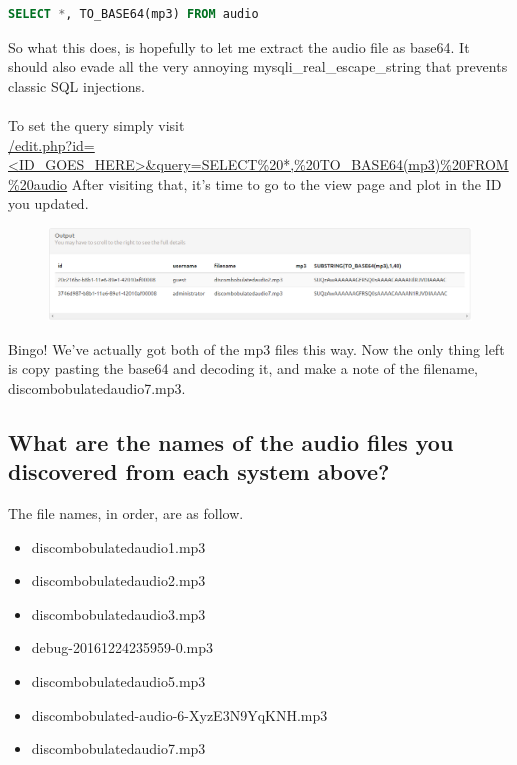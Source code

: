 \documentclass[writeup.tex]{subfiles}
\begin{document}
			\begin{lstlisting}[language=SQL]
	SELECT *, TO_BASE64(mp3) FROM audio
			\end{lstlisting}
			
			So what this does, is hopefully to let me extract the audio file as base64. It should also evade all the very annoying mysqli\_real\_escape\_string that prevents classic SQL injections.\\
			\\
			To set the query simply visit\\
			\url{/edit.php?id=<ID_GOES_HERE>&query=SELECT\%20*,\%20TO_BASE64(mp3)\%20FROM\%20audio}
			After visiting that, it's time to go to the view page and plot in the ID you updated. 
			
			\begin{figure}[H]
				\centering
				\includegraphics[width=\linewidth]{"screenshots/pwns/Site 7 - audio out"}
			\end{figure}
			
			Bingo! We've actually got both of the mp3 files this way. Now the only thing left is copy pasting the base64 and decoding it, and make a note of the filename, discombobulatedaudio7.mp3.
			
			
	
	\subsection{What are the names of the audio files you discovered from each system above?}
		The file names, in order, are as follow.
		\begin{itemize}
			\item discombobulatedaudio1.mp3
			\item discombobulatedaudio2.mp3
			\item discombobulatedaudio3.mp3
			\item debug-20161224235959-0.mp3
			\item discombobulatedaudio5.mp3
			\item discombobulated-audio-6-XyzE3N9YqKNH.mp3
			\item discombobulatedaudio7.mp3
		\end{itemize}
		
\end{document}
